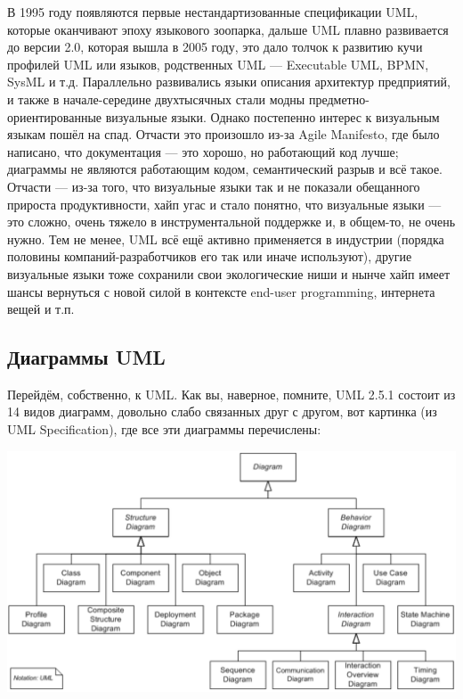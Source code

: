 \documentclass[a5paper]{article}
\begin{document}
В 1995 году появляются первые нестандартизованные спецификации UML, которые оканчивают эпоху языкового зоопарка, дальше UML плавно развивается до версии 2.0, которая вышла в 2005 году, это дало толчок к развитию кучи профилей UML или языков, родственных UML --- Executable UML, BPMN, SysML и т.д. Параллельно развивались языки описания архитектур предприятий, и также в начале-середине двухтысячных стали модны предметно-ориентированные визуальные языки. Однако постепенно интерес к визуальным языкам пошёл на спад. Отчасти это произошло из-за Agile Manifesto, где было написано, что документация --- это хорошо, но работающий код лучше; диаграммы не являются работающим кодом, семантический разрыв и всё такое. Отчасти --- из-за того, что визуальные языки так и не показали обещанного прироста продуктивности, хайп угас и стало понятно, что визуальные языки --- это сложно, очень тяжело в инструментальной поддержке и, в общем-то, не очень нужно. Тем не менее, UML всё ещё активно применяется в индустрии (порядка половины компаний-разработчиков его так или иначе используют), другие визуальные языки тоже сохранили свои экологические ниши и нынче хайп имеет шансы вернуться с новой силой в контексте end-user programming, интернета вещей и т.п.

\subsection{Диаграммы UML}

Перейдём, собственно, к UML. Как вы, наверное, помните, UML 2.5.1 состоит из 14 видов диаграмм, довольно слабо связанных друг с другом, вот картинка (из UML Specification), где все эти диаграммы перечислены:

\begin{center}
	\includegraphics[width=\textwidth]{umlDiagrams.png}
\end{center}
\end{document}
